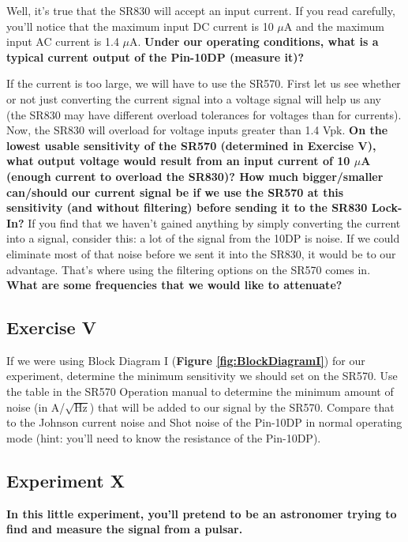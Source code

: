 \documentclass{../lab}
\begin{document}
Well, it's true that the SR830 will accept an input current. If you read carefully, you'll notice that the maximum input DC current is 10 $\mu$A and the maximum input AC current is 1.4 $\mu$A. \textbf{Under our operating conditions, what is a typical current output of the Pin-10DP (measure it)?}

If the current is too large, we will have to use the SR570. First let us see whether or not just converting the current signal into a voltage signal will help us any (the SR830 may have different overload tolerances for voltages than for currents). Now, the SR830 will overload for voltage inputs greater than 1.4 Vpk. \textbf{On the lowest usable sensitivity of the SR570 (determined in Exercise V), what output voltage would result from an input current of 10 $\mu$A (enough current to overload the SR830)? How much bigger/smaller can/should our current signal be if we use the SR570 at this sensitivity (and without filtering) before sending it to the SR830 Lock-In?} If you find that we haven't gained anything by simply converting the current into a signal, consider this: a lot of the signal from the 10DP is noise. If we could eliminate most of that noise before we sent it into the SR830, it would be to our advantage. That's where using the filtering options on the SR570 comes in. \textbf{What are some frequencies that we would like to attenuate?}

\subsection{Exercise V}

If we were using Block Diagram I (\textbf{Figure \ref{fig:BlockDiagramI}}) for our experiment, determine the minimum sensitivity we should set on the SR570. Use the table in the SR570 Operation manual to determine the minimum amount of noise (in A/$\sqrt{\text{Hz}}$) that will be added to our signal by the SR570. Compare that to the Johnson current noise and Shot noise of the Pin-10DP in normal operating mode (hint: you'll need to know the resistance of the Pin-10DP).

\subsection{Experiment X}

\textbf{In this little experiment, you'll pretend to be an astronomer trying to find and measure the signal from a pulsar.}
\end{document}
